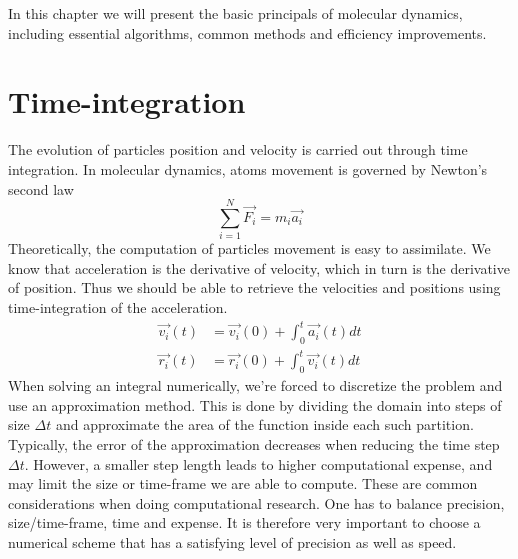 \documentclass[twoside,english]{uiofysmaster}
\begin{document}
In this chapter we will present the basic principals of molecular dynamics, including essential algorithms, common methods and efficiency improvements.


\section{Time-integration}
The evolution of particles position and velocity is carried out through time integration.
In molecular dynamics, atoms movement is governed by Newton's second law
\begin{equation}
	\sum_{i=1}^{N}\vec{F_i} = m_i\vec{a_i}
\end{equation}
Theoretically, the computation of particles movement is easy to assimilate.
We know that acceleration is the derivative of velocity, which in turn is the derivative of position.
Thus we should be able to retrieve the velocities and positions using time-integration of the acceleration.
\begin{align}
	\vec{v_i}(t) &= \vec{v_i}(0) + \int_{0}^{t}\vec{a_i}(t) dt \\
	\vec{r_i}(t) &= \vec{r_i}(0) + \int_{0}^{t}\vec{v_i}(t) dt
\end{align}
When solving an integral numerically, we're forced to discretize the problem and use an approximation method.
This is done by dividing the domain into steps of size $\Delta t$ and approximate the area of the function inside each such partition.
Typically, the error of the approximation decreases when reducing the time step $\Delta t$. 
However, a smaller step length leads to higher computational expense, and may limit the size or time-frame we are able to compute. 
These are common considerations when doing computational research. 
One has to balance precision, size/time-frame, time and expense. 
It is therefore very important to choose a numerical scheme that has a satisfying level of precision as well as speed. 
\end{document}
